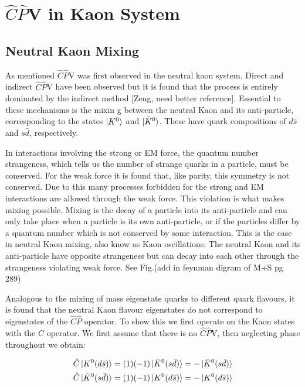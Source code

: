 \section{$\hat{C}\hat{P}$V in Kaon System} 

\subsection{Neutral Kaon Mixing}

As mentioned $\hat{C}\hat{P}$V was first observed in the neutral kaon system. Direct and indirect $\hat{C}\hat{P}$V have been observed but it is found that the process is entirely dominated by the indirect method [Zeng, need better reference]. Essential to these mechanisms is the mixin
g between the neutral Kaon and its anti-particle, corresponding to the states $\ket{K^{0}}$ and $\ket{\bar{K}^{0}}$. These have quark compositions of $d \bar{s}$ and $s \bar{d}$, respectively. 

In interactions involving the strong or EM force, the quantum number strangeness, which tells us the number of strange quarks in a particle, must be conserved. For the weak force it is found that, like parity, this symmetry is not conserved. Due to this many processes forbidden for the strong and EM interactions are allowed through the weak force. This violation is what makes mixing possible. Mixing is the decay of a particle into its anti-particle and can only take place when a particle is its own anti-particle, or if the particles differ by a quantum number which is not conserved by some interaction. This is the case in neutral Kaon mixing, also know as Kaon oscillations. The neutral Kaon and its anti-particle have opposite strangeness but can decay into each other through the strangeness violating weak force. See Fig.(add in feynman digram of M+S pg 289) 

Analogous to the mixing of mass eigenstate quarks to different quark flavours, it is found that the neutral Kaon flavour eigenstates do not correspond to eigenstates of the $\hat{C}\hat{P}$ operator. To show this we first operate on the Kaon states with the $\hat{C}$ operator. We first assume that there is no $\hat{C}\hat{P}$V, then neglecting phase throughout we obtain:

\begin{align*}
\hat{C} \ket{K^{0}(d \bar{s})} = (1)(-1) \ket{\bar{K}^{0}(s \bar{d})} = - \ket{\bar{K}^{0}(s \bar{d})}  \\
\hat{C} \ket{\bar{K}^{0}(s \bar{d})} = (1)(-1) \ket{K^{0}(d \bar{s})} = - \ket{K^{0}(d \bar{s})}  
\end{align*}

